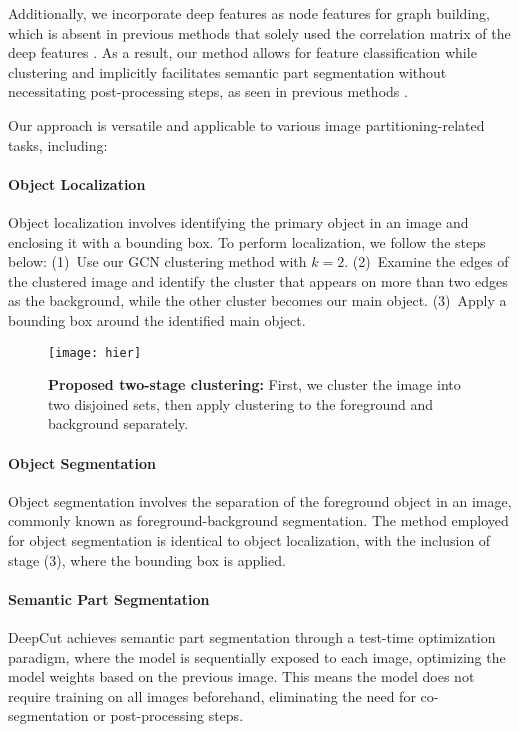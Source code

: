 \documentclass[10pt,twocolumn,letterpaper]{article}
\begin{document}
Additionally, we incorporate deep features as node features for graph building, which is absent in previous methods that solely used the correlation matrix of the deep features \cite{bianchi2020spectral, melas2022deep, wang2022self}. As a result, our method allows for feature classification while clustering and implicitly facilitates semantic part segmentation without necessitating post-processing steps, as seen in previous methods \cite{melas2022deep}.

Our approach is versatile and applicable to various image partitioning-related tasks, including:



\paragraph{Object Localization}
Object localization involves identifying the primary object in an image and enclosing it with a bounding box. To perform localization, we follow the steps below:
(1)~Use our GCN clustering method with $k = 2$. (2)~Examine the edges of the clustered image and identify the cluster that appears on more than two edges as the background, while the other cluster becomes our main object. (3)~Apply a bounding box around the identified main object.

\begin{figure}[t]
\texttt{[image: hier]}
\caption{
\textbf{Proposed two-stage clustering:} First, we cluster the image into two disjoined sets,  then apply clustering to the foreground and background separately.
}
\label{fig:hier}
 \end{figure}



\paragraph{Object Segmentation}
Object segmentation involves the separation of the foreground object in an image, commonly known as foreground-background segmentation. The method employed for object segmentation is identical to object localization, with the inclusion of stage (3), where the bounding box is applied.
 
\paragraph{Semantic Part Segmentation} 

DeepCut achieves semantic part segmentation through a test-time optimization paradigm, where the model is sequentially exposed to each image, optimizing the model weights based on the previous image. This means the model does not require training on all images beforehand, eliminating the need for co-segmentation or post-processing steps.
\end{document}
